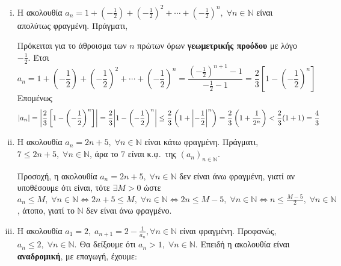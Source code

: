 \begin{examples}
\begin{enumerate}[i)]
    \item Η ακολουθία $ a_{n}= 1 + \left(- \frac{1}{2} \right) + \left(- 
        \frac{1}{2}\right)^{2} + \cdots + \left(-\frac{1}{2} 
      \right) ^{n}, 
      \; \forall n \in \mathbb{N} $ είναι απολύτως φραγμένη. Πράγματι,

      Πρόκειται για το άθροισμα των $ n $ πρώτων όρων \textbf{γεωμετρικής προόδου} με 
      λόγο $ -\frac{1}{2} $. Έτσι
      \[ a_{n} = 1 + \left(- \frac{1}{2}\right) + \left(- \frac{1}{2} 
        \right)^{2} + \cdots + \left(- \frac{1}{2} \right)^{n} = 
        \frac{(- \frac{1}{2} )^{n+1}-1}{- \frac{1}{2}-1} = 
      \frac{2}{3} \left[1 - \left(- \frac{1}{2} \right)^{n}\right] \]
      Επομένως
      \[
        \abs{a_{n}} = \abs{\frac{2}{3} \left[1-\left(- \frac{1}{2} \right)^{n}
            \right]} = \frac{2}{3} \abs{1 - \left(- 
        \frac{1}{2}\right)^{n}} \leq 
        \frac{2}{3} \left(1 + \abs{-\frac{1}{2} }^{n} \right) = 
        \frac{2}{3} \left(1+ \frac{1}{2^{n}}\right) < \frac{2}{3}
        (1+1) = \frac{4}{3} 
      \] 

    \item Η ακολουθία $ a_{n}= 2n+5, \; \forall n \in \mathbb{N} $ είναι κάτω 
      φραγμένη.
      Πράγματι, $ 7 \leq 2n+5, \; \forall n \in \mathbb{N} $, άρα το 
      7 είναι κ.φ.\ της $ (a_{n} )_{n \in \mathbb{N}} $.

      Προσοχή, η ακολουθία $ a_{n}= 2n+5, \; \forall n \in \mathbb{N} $ δεν είναι 
      άνω φραγμένη, γιατί αν υποθέσουμε ότι είναι, τότε $ \exists M>0 $ ώστε 
      $ a_{n} \leq M, \; \forall n \in \mathbb{N} 
      \Leftrightarrow 2n+5 \leq M, \; \forall n \in \mathbb{N} 
      \Leftrightarrow 2n \leq M-5, \; \forall n \in \mathbb{N}
      \Leftrightarrow n \leq \frac{M-5}{2}, \; \forall n \in \mathbb{N} $, άτοπο, 
      γιατί το $ \mathbb{N} $ δεν είναι άνω φραγμένο.

    \item Η ακολουθία $ a_{1}=2, \; a_{n+1}=2 - \frac{1}{a_{n}}, \forall n \in 
      \mathbb{N}$
      είναι φραγμένη. Προφανώς, $ a_{n}\leq 2, \; \forall n \in \mathbb{N} $.
      Θα δείξουμε ότι $ a_{n}>1, \; \forall n \in \mathbb{N} $. Επειδή η ακολουθία 
      είναι \textbf{αναδρομική}, με επαγωγή, έχουμε:


\end{enumerate}
\end{examples}
